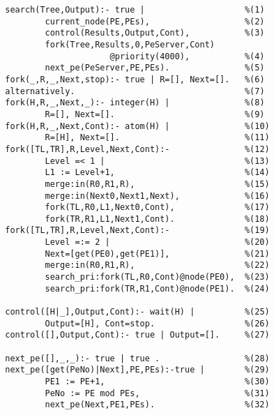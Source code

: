 {\begin{verbatim}
        search(Tree,Output):- true |                    %(1)
                current_node(PE,PEs),                   %(2)
                control(Results,Output,Cont),           %(3)
                fork(Tree,Results,0,PeServer,Cont)
                             @priority(4000),           %(4)
                next_pe(PeServer,PE,PEs).               %(5)
        fork(_,R,_,Next,stop):- true | R=[], Next=[].   %(6)
        alternatively.                                  %(7)
        fork(H,R,_,Next,_):- integer(H) |               %(8)
                R=[], Next=[].                          %(9)
        fork(H,R,_,Next,Cont):- atom(H) |               %(10)
                R=[H], Next=[].                         %(11)
        fork([TL,TR],R,Level,Next,Cont):-               %(12)
                Level =< 1 |                            %(13)
                L1 := Level+1,                          %(14)
                merge:in(R0,R1,R),                      %(15)
                merge:in(Next0,Next1,Next),             %(16)
                fork(TL,R0,L1,Next0,Cont),              %(17)
                fork(TR,R1,L1,Next1,Cont).              %(18)
        fork([TL,TR],R,Level,Next,Cont):-               %(19)
                Level =:= 2 |                           %(20)
                Next=[get(PE0),get(PE1)],               %(21)
                merge:in(R0,R1,R),                      %(22)
                search_pri:fork(TL,R0,Cont)@node(PE0),  %(23)
                search_pri:fork(TR,R1,Cont)@node(PE1).  %(24)

        control([H|_],Output,Cont):- wait(H) |          %(25)
                Output=[H], Cont=stop.                  %(26)
        control([],Output,Cont):- true | Output=[].     %(27)
        
        next_pe([],_,_):- true | true .                 %(28)
        next_pe([get(PeNo)|Next],PE,PEs):-true |        %(29)
                PE1 := PE+1,                            %(30)
                PeNo := PE mod PEs,                     %(31)
                next_pe(Next,PE1,PEs).                  %(32)
\end{verbatim} 

}
